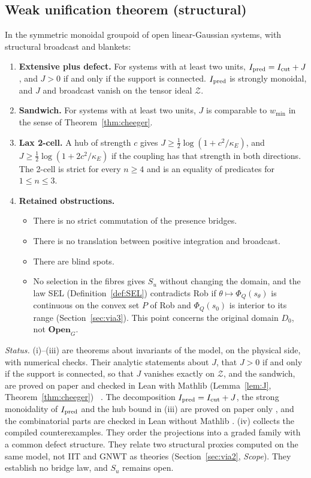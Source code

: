 \subsection{Weak unification theorem (structural)}\label{sec:unif}
\begin{theorem}\label{thm:unif}
In the symmetric monoidal groupoid of open linear-Gaussian systems, with structural broadcast and blankets:
\begin{enumerate}
\item[(i)] \textbf{Extensive plus defect.} For systems with at least two units, $I_{\rm pred}=I_{\rm cut}+J$, and $J>0$ if and only if the support is connected. $I_{\rm pred}$ is strongly monoidal, and $J$ and broadcast vanish on the tensor ideal $\mathcal Z$.
\item[(ii)] \textbf{Sandwich.} For systems with at least two units, $J$ is comparable to $w_{\min}$ in the sense of Theorem~\ref{thm:cheeger}.
\item[(iii)] \textbf{Lax 2-cell.} A hub of strength $c$ gives $J\ge\tfrac12\log(1+c^2/\kappa_E)$, and $J\ge\tfrac12\log(1+2c^2/\kappa_E)$ if the coupling has that strength in both directions. The 2-cell is strict for every $n\ge4$ and is an equality of predicates for $1\le n\le3$.
\item[(iv)] \textbf{Retained obstructions.}
  \begin{itemize}
  \item There is no strict commutation of the presence bridges.
  \item There is no translation between positive integration and broadcast.
  \item There are blind spots.
  \item No selection in the fibres gives $S_u$ without changing the domain, and the law SEL (Definition~\ref{def:SEL}) contradicts Rob if $\theta\mapsto\Phi_Q(s_\theta)$ is continuous on the convex set $P$ of Rob and $\Phi_Q(s_0)$ is interior to its range (Section~\ref{sec:via3}). This point concerns the original domain $D_0$, not $\mathbf{Open}_G$.
  \end{itemize}
\end{enumerate}
\end{theorem}
\emph{Status.} (i)--(iii) are theorems about invariants of the model, on the physical side, with numerical checks. Their analytic statements about $J$, that $J>0$ if and only if the support is connected, so that $J$ vanishes exactly on $\mathcal Z$, and the sandwich, are proved on paper and checked in Lean with Mathlib (Lemma~\ref{lem:J}, Theorem~\ref{thm:cheeger}) \stA\ \stM. The decomposition $I_{\rm pred}=I_{\rm cut}+J$, the strong monoidality of $I_{\rm pred}$ and the hub bound in (iii) are proved on paper only \stA, and the combinatorial parts are checked in Lean without Mathlib \stL. (iv) collects the compiled counterexamples. They order the projections into a graded family with a common defect structure. They relate two structural proxies computed on the same model, not IIT and GNWT as theories (Section~\ref{sec:via2}, \emph{Scope}). They establish no bridge law, and $S_u$ remains open.


